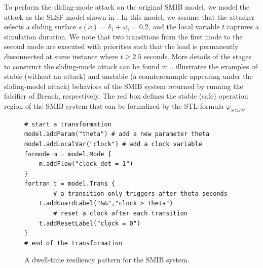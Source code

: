 %
%
To perform the sliding-mode attack on the original SMIB model, we model the attack as the SLSF model shown in . In this model, we assume that the attacker selects a sliding surface $s(x) = \delta_1 + \omega_1 = 0.2$, and the local variable $t$ captures a simulation duration. We note that two transitions from the first mode to the second mode are executed with priorities such that the load is permanently disconnected at some instance where $t \geq 2.5$ seconds. More details of the stages to construct the sliding-mode attack can be found in~\cite{farraj2014practical}.
%
%
 illustrates the examples of stable (\ie without an attack) and unstable (\ie a counterexample appearing under the sliding-model attack) behaviors of the SMIB system returned by running the falsifier of Breach, respectively. The red box defines the stable (safe) operation region of the SMIB system that can be formalized by the STL formula $\varphi_{SMIB}$.
%
\begin{figure}[!t]%
\begin{lstlisting}[basicstyle=\ttfamily\footnotesize, numbers=none]
# start a transformation
model.addParam("theta") # add a new parameter theta
model.addLocalVar("clock") # add a clock variable
formode m = model.Mode {
    m.addFlow("clock_dot = 1")
}
fortran t = model.Trans {
		# a transition only triggers after theta seconds
    t.addGuardLabel("&&","clock > theta")
		# reset a clock after each transition
    t.addResetLabel("clock = 0")
}
# end of the transformation
\end{lstlisting}
	\vspace{-0.5em}
\caption{A dwell-time resiliency pattern for the SMIB system.}%
\vspace{-1em}
%
\end{figure}

